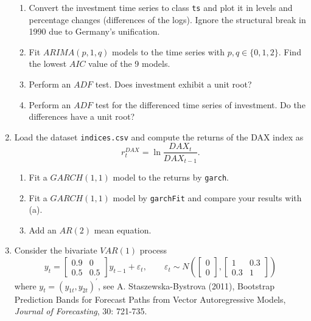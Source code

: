 \documentclass{article}
\begin{document}
\begin{enumerate}
\begin{enumerate}
\item Convert the investment time series to class \texttt{ts} and plot it in
levels and percentage changes (differences of the logs). Ignore the
structural break in 1990 due to Germany's unification.

\item Fit $ARIMA(p,1,q)$ models to the time series with $p,q\in \{0,1,2\}$.
Find the lowest $AIC$ value of the 9 models.

\item Perform an $ADF$ test. Does investment exhibit a unit root?

\item Perform an $ADF$ test for the differenced time series of investment.
Do the differences have a unit root?
\end{enumerate}

\item Load the dataset \texttt{indices.csv} and compute the returns of the
DAX index as%
\begin{equation*}
r_{t}^{DAX}=\ln \frac{DAX_{t}}{DAX_{t-1}}.
\end{equation*}

\begin{enumerate}
\item Fit a $GARCH(1,1)$ model to the returns by \texttt{garch}.

\item Fit a $GARCH(1,1)$ model by \texttt{garchFit} and compare your results
with (a).

\item Add an $AR(2)$ mean equation.
\end{enumerate}

\item Consider the bivariate $VAR(1)$ process%
\begin{equation*}
y_{t}=\left[ 
\begin{array}{cc}
0.9 & 0 \\ 
0.5 & 0.5%
\end{array}%
\right] y_{t-1}+\varepsilon _{t},\qquad \varepsilon _{t}\sim N\left( \left[ 
\begin{array}{c}
0 \\ 
0%
\end{array}%
\right] ,\left[ 
\begin{array}{cc}
1 & 0.3 \\ 
0.3 & 1%
\end{array}%
\right] \right)
\end{equation*}%
where $y_{t}=(y_{1t},y_{2t})^{\prime }$, see A. Staszewska-Bystrova (2011),
Bootstrap Prediction Bands for Forecast Paths from Vector Autoregressive
Models, \emph{Journal of Forecasting}, 30: 721-735.


\end{enumerate}
\end{document}
